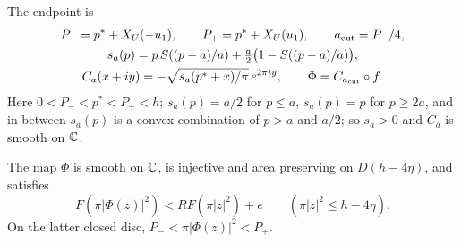 The endpoint is
\begin{gather}\label{eq:scalar-endpoint}
 P_-=p^*+X_U(-u_1),\qquad P_+=p^*+X_U(u_1),\qquad a_{\rm cut}=P_-/4,\\
 s_a(p)=p\,S((p-a)/a)+\tfrac a2\bigl(1-S((p-a)/a)\bigr),\notag\\
 C_a(x+iy)=-\sqrt{s_a(p^*+x)/\pi}\,e^{2\pi iy},\qquad \Phi=C_{a_{\rm cut}}\circ f.\notag
\end{gather}
Here $0<P_-<p^*<P_+<h$; $s_a(p)=a/2$ for $p\le a$, $s_a(p)=p$ for $p\ge2a$, and in between $s_a(p)$ is a convex
combination of $p>a$ and $a/2$; so $s_a>0$ and $C_a$ is smooth on $\mathbb{C}$.

\begin{lemma}\label{lem:scalar-endpoint}
The map $\Phi$ is smooth on $\mathbb{C}$, is injective and area preserving on $D(h-4\eta)$, and satisfies
\begin{equation}\label{eq:scalar-endpoint-error}
 F(\pi|\Phi(z)|^2)<RF(\pi|z|^2)+e\qquad(\pi|z|^2\le h-4\eta).
\end{equation}
On the latter closed disc, $P_-<\pi|\Phi(z)|^2<P_+$.
{\normalfont {}}
\end{lemma}

